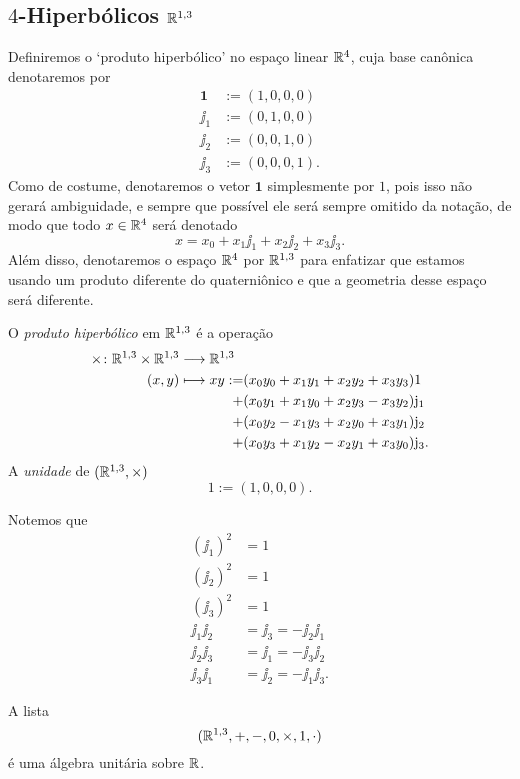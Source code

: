 \subsection{$4$-Hiperbólicos $\mathbb{R}^{1,3}$}

Definiremos o `produto hiperbólico' no espaço linear $\mathbb{R}^4$, cuja base canônica denotaremos por
	\begin{align*}
	\bm 1 &:= (1,0,0,0) \\
	\jj_1 &:= (0,1,0,0) \\
	\jj_2 &:= (0,0,1,0) \\
	\jj_3 &:= (0,0,0,1).
	\end{align*}
Como de costume, denotaremos o vetor $\bm 1$ simplesmente por $1$, pois isso não gerará ambiguidade, e sempre que possível ele será sempre omitido da notação, de modo que todo $x \in \mathbb{R}^4$ será denotado
	\begin{equation*}
	x = x_0 + x_1 \jj_1 + x_2 \jj_2 + x_3 \jj_3.
	\end{equation*}
Além disso, denotaremos o espaço $\mathbb{R}^4$ por $\mathbb{R}^{1,3}$ para enfatizar que estamos usando um produto diferente do quaterniônico e que a geometria desse espaço será diferente.

\begin{definition}
O \emph{produto hiperbólico} em $\mathbb{R}^{1,3}$ é a operação
	\begin{align*}
	\func{\htimes}{\R^{1,3} \times \R^{1,3}}{\R^{1,3}}{(x,y)}{
		\begin{aligned}[t]
		xy := &(x_0y_0 + x_1y_1 + x_2y_2 + x_3y_3) 1 \\
			+ &(x_0y_1 + x_1y_0 + x_2y_3 - x_3y_2) \jj_1 \\
			+ &(x_0y_2 - x_1y_3 + x_2y_0 + x_3y_1) \jj_2 \\
			+ &(x_0y_3 + x_1y_2 - x_2y_1 + x_3y_0) \jj_3 .
		\end{aligned}
	}
	\end{align*}
A \emph{unidade} de $(\mathbb{R}^{1,3},\times)$
	\begin{equation*}
	1 := (1,0,0,0).
	\end{equation*}
\end{definition}

Notemos que
	\begin{align*}
	(\jj_1)^2 &= 1 \\
	(\jj_2)^2 &= 1 \\
	(\jj_3)^2 &= 1 \\
	\jj_1\jj_2 &= \jj_3 = -\jj_2\jj_1 \\
	\jj_2\jj_3 &= \jj_1 = -\jj_3\jj_2 \\
	\jj_3\jj_1 &= \jj_2 = -\jj_1\jj_3.
	\end{align*}

\begin{exercise}
A lista
	\begin{equation*}
	(\mathbb{R}^{1,3},+,-,0,\times,1,\cdot)
	\end{equation*}
é uma álgebra unitária sobre $\mathbb{R}$.
\end{exercise}